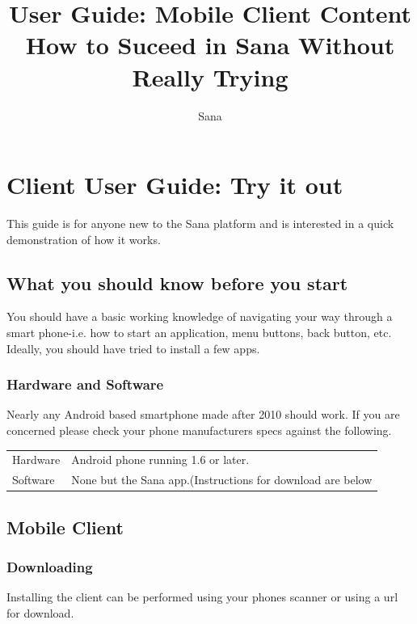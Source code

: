 \documentclass[a4paper,10pt]{article}
\title{User Guide: Mobile Client Content\\How to Suceed in Sana Without Really Trying}
\author{Sana}
\begin{document}
\maketitle

\begin{abstract}

\end{abstract}

\section{Client User Guide: Try it out}
This guide is for anyone new to the Sana platform and is interested in a quick
demonstration of how it works. 

\subsection{What you should know before you start}
You should have a basic working knowledge of navigating your way through a smart
phone-i.e. how to start an application, menu buttons, back button, etc. Ideally,
you should have tried to install a few apps.

\subsubsection{Hardware and Software}
Nearly any Android based smartphone made after 2010 should work. If you are 
concerned please check your phone manufacturers specs against the following.

\begin{tabular}{ l l }
Hardware&Android phone running 1.6 or later. \\
Software&None but the Sana app.(Instructions for download are below
\end{tabular}

\newpage

\subsection{Mobile Client}
\subsubsection{Downloading}
Installing the client can be performed using your phones scanner or using a url 
for download.
\end{document}
